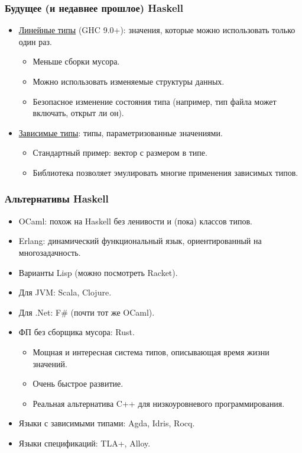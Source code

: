\documentclass[11pt]{beamer}
\begin{document}
\begin{frame}[fragile]
  \frametitle{Будущее (и недавнее прошлое) Haskell}
  \begin{itemize}
    \item \href{https://downloads.haskell.org/~ghc/latest/docs/html/users_guide/exts/linear_types.html}{Линейные типы} (GHC 9.0+): значения, которые можно использовать только один раз.
          \begin{itemize}
            \item Меньше сборки мусора.
            \item Можно использовать изменяемые структуры данных.
            \item Безопасное изменение состояния типа (например, тип файла может включать, открыт ли он).
          \end{itemize}
          \pause
    \item \href{https://serokell.io/blog/2018/12/17/why-dependent-haskell}{Зависимые типы}: типы, параметризованные значениями.
          \begin{itemize}
            \item Стандартный пример: вектор с размером в типе.
            \item Библиотека  позволяет эмулировать многие применения зависимых типов.
          \end{itemize}
  \end{itemize}
\end{frame}

\begin{frame}[fragile]
  \frametitle{Альтернативы Haskell}
  \begin{itemize}
    \item OCaml: похож на Haskell без ленивости и (пока) классов типов.
    \item Erlang: динамический функциональный язык, ориентированный на многозадачность.
    \item Варианты Lisp (можно посмотреть Racket).
          \pause
    \item Для JVM: Scala, Clojure.
    \item Для .Net: F\# (почти тот же OCaml).
          \pause
    \item ФП без сборщика мусора: Rust.
          \begin{itemize}
            \item Мощная и интересная система типов, описывающая время жизни значений.
            \item Очень быстрое развитие.
            \item Реальная альтернатива C++ для низкоуровневого программирования.
          \end{itemize}
          \pause
    \item Языки с зависимыми типами: Agda, Idris, Rocq.
          \pause
    \item Языки спецификаций: TLA+, Alloy.
  \end{itemize}
\end{frame}
\end{document}
